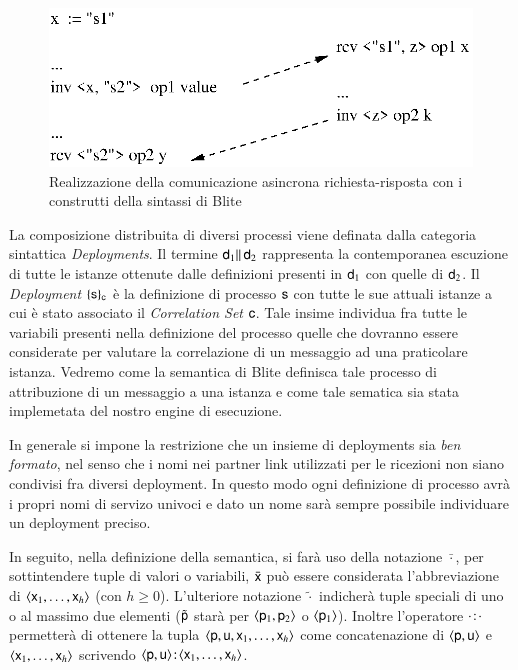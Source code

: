 \begin{figure}[ht]
\begin{center}
  \includegraphics{linguaggio/dia/com}
   \caption[Comunicazione asincrona con Blite]{
   	\textsf{{\small Realizzazione della comunicazione asincrona
   	richiesta-risposta con i construtti della sintassi di Blite}} }
  \label{fig:lin:com}
\end{center}
\end{figure}

La composizione distribuita di diversi processi viene definata dalla categoria
sintattica \emph{Deployments}. Il termine ${\sf d}_1 \|\, {\sf d}_2$ rappresenta la
contemporanea escuzione di tutte le istanze ottenute dalle
definizioni presenti in ${\sf d}_1$ con quelle di ${\sf d}_2$. Il \emph{Deployment}
$\{ {\sf s} \}_{{\sf c}}$ è la definizione di processo ${\sf s}$ con tutte le sue attuali
istanze a cui è stato associato il \emph{Correlation Set} ${\sf c}$. Tale insime
individua fra tutte le variabili presenti nella definizione del processo quelle
che dovranno essere considerate per valutare la correlazione di un messaggio
ad una praticolare istanza. Vedremo come la semantica di Blite definisca tale
processo di attribuzione di un messaggio a una istanza e come tale
sematica sia stata implemetata del nostro engine di esecuzione.
 
In generale si impone la restrizione che un insieme di deployments sia
\emph{ben formato}, nel senso che i nomi nei partner link utilizzati per le
ricezioni non siano condivisi fra diversi deployment. In questo modo ogni
definizione di processo avrà i propri nomi di servizo univoci e dato un nome
sarà sempre possibile individuare un deployment preciso.

In seguito, nella definizione della semantica, si farà uso della notazione
$\bar{\cdot}$, per sottintendere tuple di valori o variabili, $\bar{{\sf x}}$ può
essere considerata l'abbreviazione di $\langle {\sf x}_1,
\ldots, {\sf x}_h \rangle$ (con $h \geq 0$). L'ulteriore notazione $\tilde{\cdot}$
indicherà tuple speciali di uno o al massimo due elementi ($\tilde{{\sf p}}$ starà
per $\langle {\sf p}_1, {\sf p}_2 \rangle$ o $\langle {\sf p}_1 \rangle$). Inoltre l'operatore
${\sf \cdot}\! : \! {\sf \cdot}$ permetterà di ottenere la tupla $\langle {\sf p},
{\sf u},{\sf x}_1,\ldots,{\sf x}_h \rangle$ come concatenazione di $\langle {\sf p}, {\sf u} \rangle$ e
$\langle {\sf x}_1,\ldots,{\sf x}_h \rangle$ scrivendo $\langle {\sf p},
{\sf u} \rangle\! : \! \langle {\sf x}_1,\ldots,{\sf x}_h \rangle$.
\\


